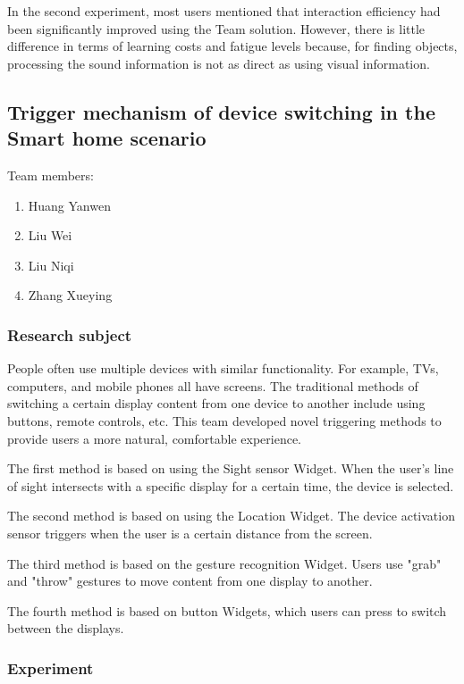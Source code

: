 In the second experiment, most users mentioned that interaction efficiency had been significantly improved using the Team solution. However, there is little difference in terms of learning costs and fatigue levels because, for finding objects, processing the sound information is not as direct as using visual information. 

\subsection{Trigger mechanism of device switching in the Smart home scenario}

Team members:
\begin{enumerate}
    \item Huang Yanwen 
    \item Liu Wei 
    \item Liu Niqi 
    \item Zhang Xueying 
\end{enumerate}

\subsubsection{Research subject}

People often use multiple devices with similar functionality. For example, TVs, computers, and mobile phones all have screens. The traditional methods of switching a certain display content from one device to another include using buttons, remote controls, etc. This team developed novel triggering methods to provide users a more natural, comfortable experience.

The first method is based on using the Sight sensor Widget. When the user's line of sight intersects with a specific display for a certain time, the device is selected.

The second method is based on using the Location Widget. The device activation sensor triggers when the user is a certain distance from the screen.

The third method is based on the gesture recognition Widget. Users use "grab" and "throw" gestures to move content from one display to another.
 
The fourth method is based on button Widgets, which users can press to switch between the displays.

\subsubsection{Experiment}

